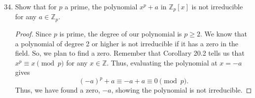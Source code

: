 \documentclass[12pt, oneside]{book}
\newcommand{\Z}{\mathbb{Z}}
\newcommand{\pf}[1]{
    \begin{customframedproof}[linecolor=orangehdx!75]
        \begin{proof}
        #1
        \end{proof}
    \end{customframedproof}
}
\begin{document}
\begin{enumerate}
    \setcounter{enumi}{33}
    \item Show that for \(p\) a prime, the polynomial \(x^{p} + a\) in \(\Z_{p} [x]\) is not irreducible for any \(a \in \Z_{p}\).
          \pf{
            Since \(p\) is prime, the degree of our polynomial is \(p \ge 2\). We know that a polynomial of degree 2 or higher is not irreducible if it has a zero in the field. So, we plan to find a zero. Remember that Corollary 20.2 tells us that \(x^{p} \equiv x \pmod{p}\) for any \(x \in \Z\). Thus, evaluating the polynomial at \(x = -a\) gives
            \[
                (-a)^{p} + a \equiv -a + a \equiv 0 \pmod{p}.
            \]
            Thus, we have found a zero, \(-a\), showing the polynomial is not irreducible.
          }
\end{enumerate}


\end{document}
